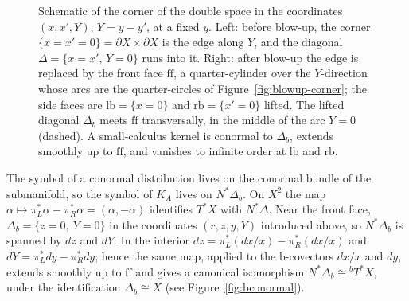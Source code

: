 \documentclass[12pt,oneside,reqno]{article}
\theoremstyle{plain}
\theoremstyle{definition}
\theoremstyle{remark}
\begin{document}
\begin{figure}[!htb]
\caption[Conormal kernel on the b-double space]{Schematic of the corner of
the double space in the coordinates \((x,x',Y)\), \(Y=y-y'\), at a fixed
\(y\).  Left: before blow-up, the corner \(\{x=x'=0\}=\partial X\times
\partial X\) is the edge along \(Y\), and the diagonal \(\Delta=\{x=x',\,
Y=0\}\) runs into it.  Right: after blow-up the edge is replaced by the
front face \(\mathrm{ff}\), a quarter-cylinder over the \(Y\)-direction
whose arcs are the quarter-circles of Figure~\ref{fig:blowup-corner}; the
side faces are \(\mathrm{lb}=\{x=0\}\) and \(\mathrm{rb}=\{x'=0\}\) lifted.
The lifted diagonal \(\Delta_b\) meets \(\mathrm{ff}\) transversally, in the
middle of the arc \(Y=0\) (dashed).  A small-calculus kernel is conormal to
\(\Delta_b\), extends smoothly up to \(\mathrm{ff}\), and vanishes to
infinite order at \(\mathrm{lb}\) and \(\mathrm{rb}\).}
\end{figure}

The symbol of a conormal distribution lives on the conormal bundle of the
submanifold, so the symbol of \(K_A\) lives on \(N^*\Delta_b\).  On \(X^2\)
the map \(\alpha\mapsto\pi_L^*\alpha-\pi_R^*\alpha=(\alpha,-\alpha)\)
identifies \(T^*X\) with \(N^*\Delta\).  Near the front face,
\(\Delta_b=\{z=0,\ Y=0\}\) in the coordinates \((r,z,y,Y)\) introduced
above, so \(N^*\Delta_b\) is spanned by \(dz\) and \(dY\).  In the interior
\(dz=\pi_L^*(dx/x)-\pi_R^*(dx/x)\) and \(dY=\pi_L^*dy-\pi_R^*dy\); hence the
same map, applied to the b-covectors \(dx/x\) and \(dy\), extends smoothly up
to \(\mathrm{ff}\) and gives a canonical isomorphism
\(N^*\Delta_b\cong{}^bT^*X\), under the identification
\(\Delta_b\cong X\) (see Figure~\ref{fig:bconormal}).
\end{document}
